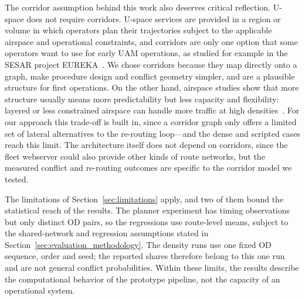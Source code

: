 The corridor assumption behind this work also deserves critical reflection. U-space does not require corridors. U-space services are provided in a region or volume in which operators plan their trajectories subject to the applicable airspace and operational constraints, and corridors are only one option that some operators want to use for early UAM operations, as studied for example in the SESAR project EUREKA~\cite{sesar_eureka_project}. We chose corridors because they map directly onto a graph, make procedure design and conflict geometry simpler, and are a plausible structure for first operations. On the other hand, airspace studies show that more structure usually means more predictability but less capacity and flexibility: layered or less constrained airspace can handle more traffic at high densities~\cite{sunil2015metropolis,schneider2014metropolis,abdellaoui2025_airspace_uam,schuchardt2023_atm_uam_review}. For our approach this trade-off is built in, since a corridor graph only offers a limited set of lateral alternatives to the re-routing loop---and the dense and scripted cases reach this limit. The architecture itself does not depend on corridors, since the fleet webserver could also provide other kinds of route networks, but the measured conflict and re-routing outcomes are specific to the corridor model we tested.

The limitations of Section~\ref{sec:limitations} apply, and two of them bound the statistical reach of the results. The planner experiment has \paObs{} timing observations but only \paPairs{} distinct OD pairs, so the regressions use \paPairs{} route-level means, subject to the shared-network and regression assumptions stated in Section~\ref{sec:evaluation_methodology}. The density runs use one fixed OD sequence, order and seed; the reported shares therefore belong to this one run and are not general conflict probabilities. Within these limits, the results describe the computational behavior of the prototype pipeline, not the capacity of an operational system.
